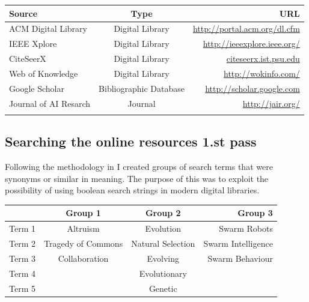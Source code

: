 \documentclass[a4paper]{book}
\begin{document}
\begin{center}
    \begin{tabular}{| l | c | r| }
    \hline
    Source                  &   Type                        & URL \\ \hline \hline
    ACM Digital Library     &   Digital Library             & \url{http://portal.acm.org/dl.cfm} \\  \hline %
    IEEE Xplore             &   Digital Library             & \url{http://ieeexplore.ieee.org/} \\ \hline   %
    CiteSeerX               &   Digital Library             & \url{citeseerx.ist.psu.edu} \\ \hline         %
    Web of Knowledge        &   Digital Library             & \url{http://wokinfo.com/} \\ \hline           %
    Google Scholar          &   Bibliographic Database      & \url{http://scholar.google.com} \\ \hline     %
    Journal of AI Resarch   &   Journal                     & \url{http://jair.org/} \\        \hline             %
    \hline
    \label{table:sources}
    \end{tabular}
\end{center}

\subsection{Searching the online resources 1.st pass}

Following the methodology in \cite{Lillegraven354464} I created groups of search terms that were synonyms or similar in meaning. The purpose of this was to exploit the possibility of using boolean search strings in modern digital libraries.

\begin{center}
    \begin{tabular}{| l | c | c | r |}
      \hline
       & Group 1 & Group 2 & Group 3 \\ \hline
       Term 1 & Altruism & Evolution & Swarm Robots \\ \hline
       Term 2 & Tragedy of Commons & Natural Selection & Swarm Intelligence \\ \hline
       Term 3 & Collaboration & Evolving & Swarm Behaviour \\ \hline
       Term 4 & & Evolutionary & \\ \hline
       Term 5 & & Genetic & \\ \hline
       \hline
       \end{tabular}
      \end{center}
      
\end{document}
